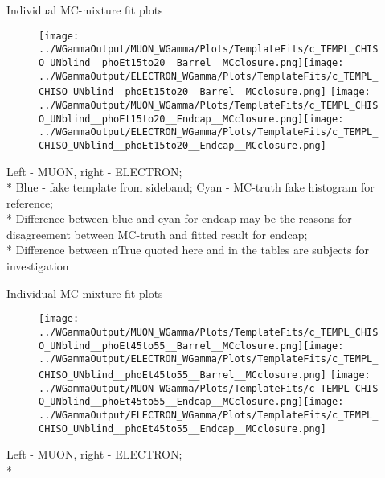 \documentclass{beamer}
\begin{document}
\begin{frame}{Individual MC-mixture fit plots}
  \begin{figure}
    \centering
    \texttt{[image: ../WGammaOutput/MUON\_WGamma/Plots/TemplateFits/c\_TEMPL\_CHISO\_UNblind\_\_phoEt15to20\_\_Barrel\_\_MCclosure.png]}\texttt{[image: ../WGammaOutput/ELECTRON\_WGamma/Plots/TemplateFits/c\_TEMPL\_CHISO\_UNblind\_\_phoEt15to20\_\_Barrel\_\_MCclosure.png]}
    \texttt{[image: ../WGammaOutput/MUON\_WGamma/Plots/TemplateFits/c\_TEMPL\_CHISO\_UNblind\_\_phoEt15to20\_\_Endcap\_\_MCclosure.png]}\texttt{[image: ../WGammaOutput/ELECTRON\_WGamma/Plots/TemplateFits/c\_TEMPL\_CHISO\_UNblind\_\_phoEt15to20\_\_Endcap\_\_MCclosure.png]}
  \end{figure}
  \scriptsize 
  Left - MUON, right - ELECTRON; \\*
  Blue - fake template from sideband; Cyan - MC-truth fake histogram for reference; \\* 
  Difference between blue and cyan for endcap may be the reasons for disagreement between MC-truth and fitted result for endcap;\\*
  Difference between nTrue quoted here and in the tables are subjects for investigation
\end{frame}

\begin{frame}{Individual MC-mixture fit plots}
  \begin{figure}
    \centering
    \texttt{[image: ../WGammaOutput/MUON\_WGamma/Plots/TemplateFits/c\_TEMPL\_CHISO\_UNblind\_\_phoEt45to55\_\_Barrel\_\_MCclosure.png]}\texttt{[image: ../WGammaOutput/ELECTRON\_WGamma/Plots/TemplateFits/c\_TEMPL\_CHISO\_UNblind\_\_phoEt45to55\_\_Barrel\_\_MCclosure.png]}
    \texttt{[image: ../WGammaOutput/MUON\_WGamma/Plots/TemplateFits/c\_TEMPL\_CHISO\_UNblind\_\_phoEt45to55\_\_Endcap\_\_MCclosure.png]}\texttt{[image: ../WGammaOutput/ELECTRON\_WGamma/Plots/TemplateFits/c\_TEMPL\_CHISO\_UNblind\_\_phoEt45to55\_\_Endcap\_\_MCclosure.png]}
  \end{figure}
  \scriptsize Left - MUON, right - ELECTRON; \\*
\end{frame}
\end{document}
